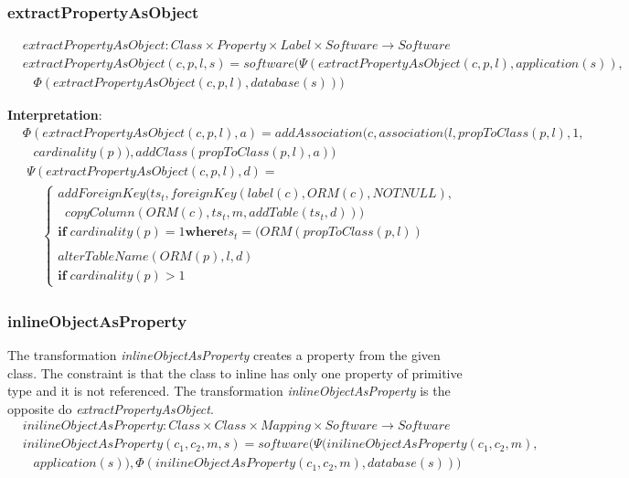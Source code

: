 \documentclass[10pt]{article}
\begin{document}
\subsubsection{extractPropertyAsObject}
\begin{align}
& extractPropertyAsObject: Class \times Property \times Label \times Software \rightarrow Software \nonumber \\
& extractPropertyAsObject(c, p, l, s) = 
 software(\Psi(extractPropertyAsObject(c, p, l), application(s)), \nonumber \\
 & \;\;\; \Phi(extractPropertyAsObject(c, p, l), database(s)))
\end{align}

\noindent \textbf{Interpretation}:
\begin{align}
& \Phi(extractPropertyAsObject(c, p, l), a) =  addAssociation(c,  association(l, propToClass(p, l), 1,\nonumber \\
 & \;\;\;  cardinality(p)), addClass(propToClass(p, l), a))
\end{align}
\begin{align}
& \Psi(extractPropertyAsObject(c, p, l), d) = \\
& \;\;\;\; \begin{cases}
 addForeignKey(ts_t, foreignKey(label(c), ORM(c), NOTNULL), \\
 \;\; copyColumn(ORM(c), ts_t, m,  addTable(ts_t, d))) \\
 \mathbf{if}\; cardinality(p) = 1
 \mathbf{where} ts_t = (ORM(propToClass(p, l))
 \\\\
 alterTableName(ORM(p), l, d) \\
 \mathbf{if}\; cardinality(p) > 1
 \end{cases}
\end{align}


\subsubsection{inlineObjectAsProperty}
The transformation \emph{inlineObjectAsProperty} creates a property from the given class. The constraint is that the class to inline has only one property of primitive type and it is not referenced. The transformation \emph{inlineObjectAsProperty} is the opposite do \emph{extractPropertyAsObject}.
\begin{align}
& inilineObjectAsProperty: Class \times Class \times Mapping \times Software \rightarrow Software \nonumber \\
& inilineObjectAsProperty(c_1, c_2, m, s) = software(\Psi(inilineObjectAsProperty(c_1, c_2, m), \nonumber \\  
& \;\;\; application(s)), \Phi(inilineObjectAsProperty(c_1, c_2, m), database(s)))
\end{align}
\end{document}
